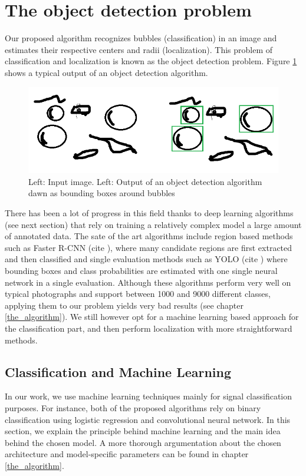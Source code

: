 	
	\section{The object detection problem}\label{the_object_detection_problem}
	
	Our proposed algorithm recognizes bubbles (classification) in an image and estimates their respective centers and radii (localization). This problem of classification and localization is known as the object detection problem. Figure \ref{fig:obj_detec_intro} shows a typical output of an object detection algorithm. 
	
	\begin{figure}
		\centering
		\includegraphics[scale=1]{images/object_detection_intro.png}
		\caption{Left: Input image. Left: Output of an object detection algorithm dawn as bounding boxes around bubbles}
		\label{fig:obj_detec_intro}
	\end{figure}
	
	There has been a lot of progress in this field thanks to deep learning algorithms (see next section) that rely on training a relatively complex model a large amount of annotated data. The sate of the art algorithms include region based methods such as Faster R-CNN (cite \cite{faster_rcnn}), where many candidate regions are first extracted and then classified and single evaluation methods such as YOLO (cite \cite{YOLO}) where bounding boxes and class probabilities are estimated with one single neural network in a single evaluation. Although these algorithms perform very well on typical photographs and support between 1000 and 9000 different classes, applying them to our problem yields very bad results (see chapter \ref{the_algorithm}). We still however opt for a machine learning based approach for the classification part, and then perform localization with more straightforward methods.
		
		\subsection{Classification and Machine Learning}\label{machine_learning}
		In our work, we use machine learning techniques mainly for signal classification purposes. For instance, both of the proposed algorithms rely on binary classification using logistic regression and convolutional neural network. In this section, we explain the principle behind machine learning and the main idea behind the chosen model. A more thorough argumentation about the chosen architecture and model-specific parameters can be found in chapter \ref{the_algorithm}.

